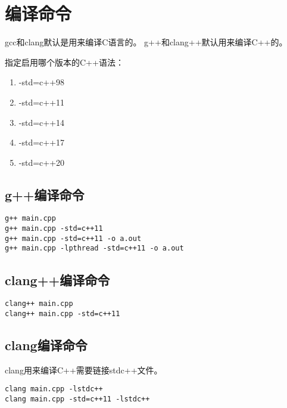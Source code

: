 \chapter{编译命令}

gcc和clang默认是用来编译C语言的。
g++和clang++默认用来编译C++的。

指定启用哪个版本的C++语法：
\begin{enumerate}
  \item -std=c++98
  \item -std=c++11
  \item -std=c++14
  \item -std=c++17
  \item -std=c++20
\end{enumerate}

\section{g++编译命令}

\begin{verbatim}
g++ main.cpp
g++ main.cpp -std=c++11
g++ main.cpp -std=c++11 -o a.out
g++ main.cpp -lpthread -std=c++11 -o a.out
\end{verbatim}

\section{clang++编译命令}

\begin{verbatim}
clang++ main.cpp
clang++ main.cpp -std=c++11
\end{verbatim}

\section{clang编译命令}

clang用来编译C++需要链接stdc++文件。

\begin{verbatim}
clang main.cpp -lstdc++
clang main.cpp -std=c++11 -lstdc++
\end{verbatim}

